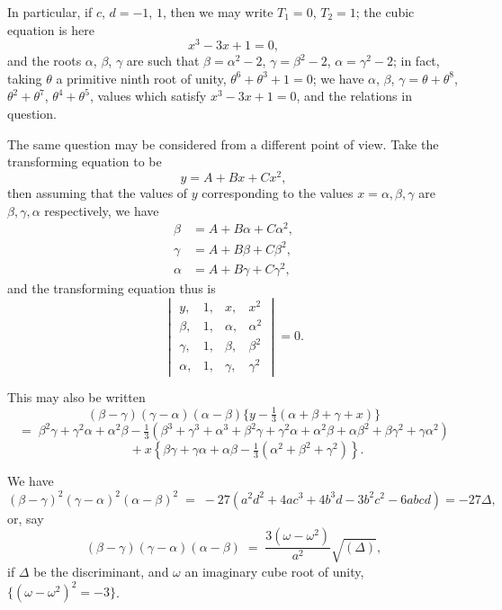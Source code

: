 \documentclass[11pt]{article}
\begin{document}
\medskip

In particular, if $c$, $d = -1$, $1$, then we may write $T_1 = 0$, $T_2 = 1$; the cubic equation is here
\[
x^3 - 3x + 1 = 0,
\]
and the roots $\alpha$, $\beta$, $\gamma$ are such that $\beta = \alpha^2 - 2$, $\gamma = \beta^2 - 2$, $\alpha = \gamma^2 - 2$; in fact, taking $\theta$ a primitive ninth root of unity, $\theta^6 + \theta^3 + 1 = 0$; we have $\alpha$, $\beta$, $\gamma = \theta + \theta^8$, $\theta^2 + \theta^7$, $\theta^4 + \theta^5$, values which satisfy $x^3 - 3x + 1 = 0$, and the relations in question.

\medskip

The same question may be considered from a different point of view. Take the transforming equation to be
\[
y = A + Bx + Cx^2,
\]
then assuming that the values of $y$ corresponding to the values $x = \alpha, \beta, \gamma$ are $\beta, \gamma, \alpha$ respectively, we have
\begin{align*}
\beta &= A + B\alpha + C\alpha^2,\\
\gamma &= A + B\beta + C\beta^2,\\
\alpha &= A + B\gamma + C\gamma^2,
\end{align*}
and the transforming equation thus is
\[
\begin{vmatrix} y, & 1, & x, & x^2\\ \beta, & 1, & \alpha, & \alpha^2\\ \gamma, & 1, & \beta, & \beta^2\\ \alpha, & 1, & \gamma, & \gamma^2 \end{vmatrix} = 0.
\]

This may also be written
\[
(\beta-\gamma)(\gamma-\alpha)(\alpha-\beta)\bigl\{y - \tfrac{1}{3}(\alpha+\beta+\gamma+x)\bigr\}
\]
\[
=\; \beta^2\gamma + \gamma^2\alpha + \alpha^2\beta - \tfrac{1}{3}(\beta^3 + \gamma^3 + \alpha^3 + \beta^2\gamma + \gamma^2\alpha + \alpha^2\beta + \alpha\beta^2 + \beta\gamma^2 + \gamma\alpha^2)
\]
\[
\qquad + x\!\left\{\beta\gamma + \gamma\alpha + \alpha\beta - \tfrac{1}{3}(\alpha^2 + \beta^2 + \gamma^2)\right\}.
\]

We have
\[
(\beta-\gamma)^2(\gamma-\alpha)^2(\alpha-\beta)^2 \;=\; -27\!\left(a^2d^2 + 4ac^3 + 4b^3 d - 3b^2c^2 - 6abcd\right) = -27\Delta,
\]
or, say
\[
(\beta-\gamma)(\gamma-\alpha)(\alpha-\beta) \;=\; \frac{3(\omega-\omega^2)}{a^2}\sqrt{(\Delta)},
\]
if $\Delta$ be the discriminant, and $\omega$ an imaginary cube root of unity, $\{(\omega-\omega^2)^2 = -3\}$.

\medskip
\end{document}
